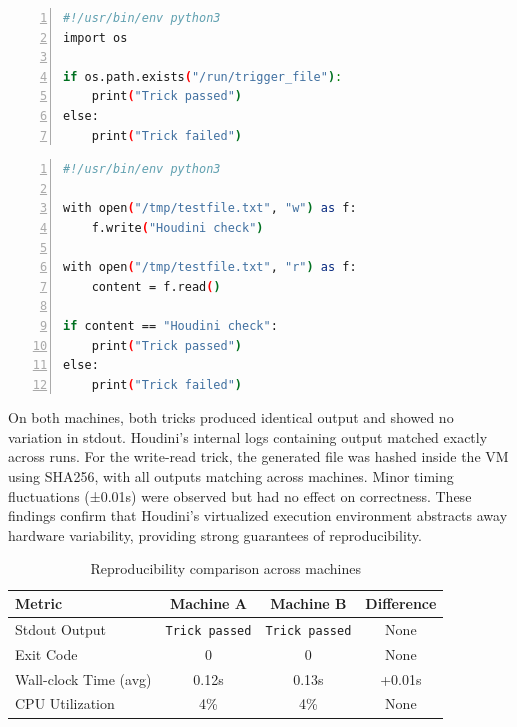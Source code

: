 \documentclass[12pt]{report}
\begin{document}
\begin{doublespace}
\begin{lstlisting}[language=bash, caption={Trick \#1}, label={lst:escape-trick}, numbers=left, numberstyle=\tiny, stepnumber=1, frame=single, breaklines=true, backgroundcolor=\color{gray!10}, basicstyle=\ttfamily\footnotesize, showspaces=false, showstringspaces=false]
#!/usr/bin/env python3
import os

if os.path.exists("/run/trigger_file"):
    print("Trick passed")
else:
    print("Trick failed")
\end{lstlisting}

\begin{lstlisting}[language=bash, caption={Trick \#2}, label={lst:escape-trick}, numbers=left, numberstyle=\tiny, stepnumber=1, frame=single, breaklines=true, backgroundcolor=\color{gray!10}, basicstyle=\ttfamily\footnotesize, showspaces=false, showstringspaces=false]
#!/usr/bin/env python3

with open("/tmp/testfile.txt", "w") as f:
    f.write("Houdini check")

with open("/tmp/testfile.txt", "r") as f:
    content = f.read()

if content == "Houdini check":
    print("Trick passed")
else:
    print("Trick failed")
\end{lstlisting}

On both machines, both tricks produced identical output and showed no variation in stdout. Houdini’s internal logs containing output matched exactly across runs. For the write-read trick, the generated file was hashed inside the VM using SHA256, with all outputs matching across machines. Minor timing fluctuations (±0.01s) were observed but had no effect on correctness. These findings confirm that Houdini's virtualized execution environment abstracts away hardware variability, providing strong guarantees of reproducibility.

\begin{table}[h]
\centering
\caption{Reproducibility comparison across machines}
\label{tab:reproducibility-results}
\begin{tabular}{|l|c|c|c|}
\hline
\textbf{Metric} & \textbf{Machine A} & \textbf{Machine B} & \textbf{Difference} \\
\hline
Stdout Output & \texttt{Trick passed} & \texttt{Trick passed} & None \\
Exit Code & 0 & 0 & None \\
Wall-clock Time (avg) & 0.12s & 0.13s & +0.01s \\
CPU Utilization & 4\% & 4\% & None \\
\hline
\end{tabular}
\end{table}


\end{doublespace}
\end{document}

